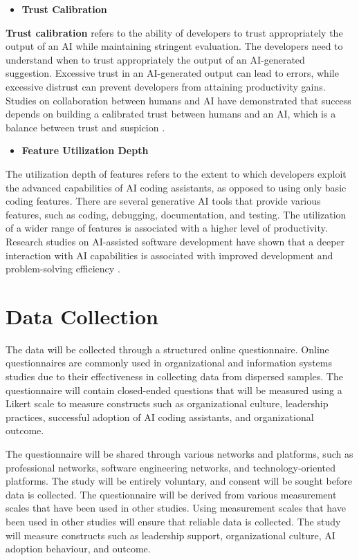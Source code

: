 \begin{itemize}
	\item \textbf{Trust Calibration} 
\end{itemize}
\textbf{Trust calibration} refers to the ability of developers to trust appropriately the output of an AI while maintaining stringent evaluation. The developers need to understand when to trust appropriately the output of an AI-generated suggestion. Excessive trust in an AI-generated output can lead to errors, while excessive distrust can prevent developers from attaining productivity gains. Studies on collaboration between humans and AI have demonstrated that success depends on building a calibrated trust between humans and an AI, which is a balance between trust and suspicion \autocite{Noy2023}.

\begin{itemize}
	\item \textbf{Feature Utilization Depth} 
\end{itemize}
The utilization depth of features refers to the extent to which developers exploit the advanced capabilities of AI coding assistants, as opposed to using only basic coding features. There are several generative AI tools that provide various features, such as coding, debugging, documentation, and testing. The utilization of a wider range of features is associated with a higher level of productivity. Research studies on AI-assisted software development have shown that a deeper interaction with AI capabilities is associated with improved development and problem-solving efficiency \autocite{Brynjolfsson2025}.

\section{Data Collection}
\label{sec:Data Collection}
The data will be collected through a structured online questionnaire. Online questionnaires are commonly used in organizational and information systems studies due to their effectiveness in collecting data from dispersed samples. The questionnaire will contain closed-ended questions that will be measured using a Likert scale to measure constructs such as organizational culture, leadership practices, successful adoption of AI coding assistants, and organizational outcome.

The questionnaire will be shared through various networks and platforms, such as professional networks, software engineering networks, and technology-oriented platforms. The study will be entirely voluntary, and consent will be sought before data is collected.
The questionnaire will be derived from various measurement scales that have been used in other studies. Using measurement scales that have been used in other studies will ensure that reliable data is collected. The study will measure constructs such as leadership support, organizational culture, AI adoption behaviour, and outcome.

